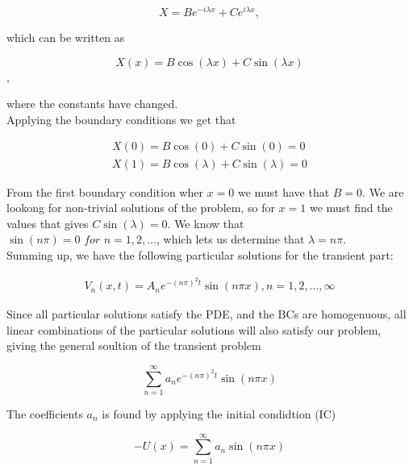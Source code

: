 \documentclass{article}
\begin{document}
\begin{equation}
X = Be^{-i\lambda x} + Ce^{i\lambda x},
\label{eqn:xDependenttransientTerm1D}
\end{equation}

which can be written as

\begin{equation}
X(x) = B\cos(\lambda x) + C\sin(\lambda x) 
\end{equation},

where the constants have changed.\\

Applying the boundary conditions we get that

\begin{eqnarray}
X(0) = B\cos(0) + C\sin(0) = 0 \\ 
X(1) = B\cos(\lambda) + C\sin(\lambda) = 0
\end{eqnarray}

From the first boundary condition wher $x=0$ we must have that $B=0$. We are lookong for non-trivial solutions of the problem, so for $x=1$ we must find the  values that gives $C\sin(\lambda)=0$. We know that\\ $\sin(n \pi) =0 \textit{ for } n = 1,2, \ldots $, which lets us determine that $\lambda = n \pi$.\\

Summing up, we have the following particular solutions for the transient part:

\begin{subequations}
	\begin{eqnarray}
	V_n(x,t) = A_ne^{-(n\pi)^2 t}\sin(n \pi x), n=1,2,...,\infty
	\end{eqnarray}
\end{subequations}

Since all particular solutions satisfy the PDE, and the BCs are homogenuous, all linear combinations of the particular solutions will also satisfy our problem, giving the general soultion of the transient problem

\begin{equation}
\sum_{n=1}^{\infty} a_ne^{-(n\pi)^2 t}\sin(n \pi x)
\label{eqn:FundamentalSolutionODE}
\end{equation}

The coefficients $a_n$ is found by applying the initial condidtion (IC)

\begin{equation}\label{eq:genSolTrans}
-U(x) = \sum_{n=1}^{\infty} a_n\sin(n \pi x) 
\end{equation}
\end{document}
